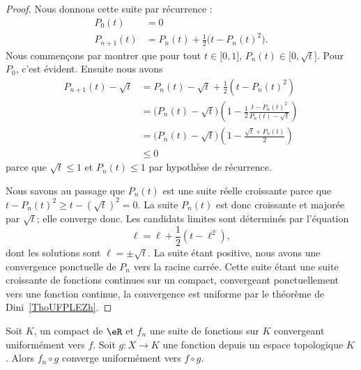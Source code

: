 \begin{proof}
    Nous donnons cette suite par récurrence :
    \begin{subequations}
        \begin{align}
            P_0(t)&=0\\
            P_{n+1}(t)&=P_n(t)+\frac{ 1 }{2}\big( t-P_n(t)^2 \big).
        \end{align}
    \end{subequations}
    Nous commençons par montrer que pour tout \( t\in \mathopen[ 0 , 1 \mathclose]\), \( P_n(t)\in\mathopen[ 0 , \sqrt{t} \mathclose]\). Pour \( P_0\), c'est évident. Ensuite nous avons
    \begin{subequations}
        \begin{align}
            P_{n+1}(t)-\sqrt{t}&=P_n(t)-\sqrt{t}+\frac{ 1 }{2}(t-P_n(t)^2)\\
            &=\big( P_n(t)-\sqrt{t} \big)\left( 1-\frac{ 1 }{2}\frac{ t-P_n(t)^2 }{ P_n(t)-\sqrt{t} } \right)\\
            &=\big( P_n(t)-\sqrt{t} \big)\left( 1-\frac{ \sqrt{t}+P_n(t) }{2} \right)\\
            &\leq 0
        \end{align}
    \end{subequations}
    parce que \( \sqrt{t} \leq 1\) et \( P_n(t)\leq 1\) par hypothèse de récurrence.

    Nous savons au passage que \( P_n(t)\) est une suite réelle croissante parce que \( t-P_n(t)^2\geq t-(\sqrt{t})^2=0\). La suite \( P_n(t)\) est donc croissante et majorée par \( \sqrt{t}\); elle converge donc. Les candidats limites sont déterminés par l'équation
    \begin{equation}
        \ell=\ell+\frac{ 1 }{2}(t-\ell^2),
    \end{equation}
    dont les solutions sont \( \ell=\pm\sqrt{t}\). La suite étant positive, nous avons une convergence ponctuelle de \( P_n\) vers la racine carrée. Cette suite étant une suite croissante de fonctions continues sur un compact, convergeant ponctuellement vers une fonction continue, la convergence est uniforme par le théorème de Dini~\ref{ThoUFPLEZh}.
\end{proof}

\begin{lemma}           \label{LemUuxcqY}
    Soit \( K\), un compact de \( \eR\) et \( f_n\) une suite de fonctions sur \( K\) convergeant uniformément vers \( f\). Soit \( g\colon X\to K\) une fonction depuis un espace topologique \( K\). Alors \( f_n\circ g\) converge uniformément vers \( f\circ g\).
\end{lemma}

